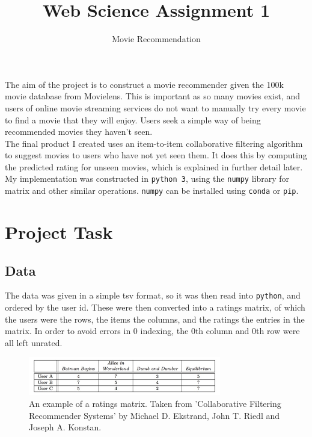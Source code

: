 \documentclass{scrartcl}
\begin{document}
\title{Web Science Assignment 1}
\subtitle{Movie Recommendation}
\maketitle

\section{}
The aim of the project is to construct a movie recommender given the 100k movie database from Movielens. This is important as so many movies exist, and users of online movie streaming services do not want to manually try every movie to find a movie that they will enjoy. Users seek a simple way of being recommended movies they haven't seen.\\

The final product I created uses an item-to-item collaborative filtering algorithm to suggest movies to users who have not yet seen them. It does this by computing the predicted rating for unseen movies, which is explained in further detail later. \\

My implementation was constructed in \texttt{python 3}, using the \texttt{numpy} library for matrix and other similar operations. \texttt{numpy} can be installed using \texttt{conda} or \texttt{pip}.

\newpage
\section{Project Task}
\subsection{Data}
The data was given in a simple tsv format, so it was then read into \texttt{python}, and ordered by the user id. These were then converted into a ratings matrix, of which the users were the rows, the items the columns, and the ratings the entries in the matrix. In order to avoid errors in 0 indexing, the 0th column and 0th row were all left unrated.

\begin{figure}[h]
  \centering
    \includegraphics[width=0.75\textwidth]{rm.png}
  \caption{An example of a ratings matrix. Taken from 'Collaborative Filtering Recommender Systems' by Michael D. Ekstrand, John T. Riedl and Joseph A. Konstan.}
\end{figure}
\end{document}
